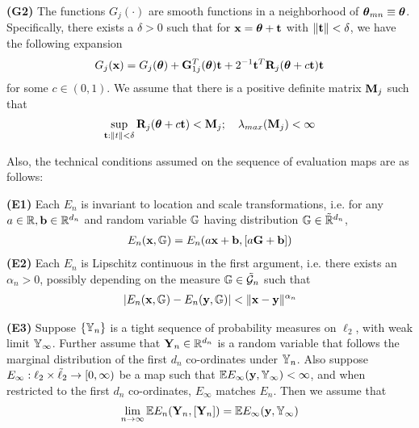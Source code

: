 \noindent\textbf{(G2)} 
The functions $G_{j} (\cdot)$ are smooth functions in a neighborhood of ${\boldsymbol{\theta}}_{ m n} \equiv {\boldsymbol{\theta}}$. 
Specifically, there exists a $\delta > 0$ such that for 
$ {\bf{x}} = {\boldsymbol{\theta}} + {\bf{t}}$ with $\| {\bf{t}} \| < \delta$, we have the following expansion
%
\begin{align}
G_{j} ({\bf{x}}) = G_{j} ({\boldsymbol{\theta}}) + {\mathbf{G}}_{1 j}^{T} ({\boldsymbol{\theta}}) {\bf{t}} 
+ 2^{-1} {\bf{t}}^{T} {\mathbf{R}}_{j} ({\boldsymbol{\theta}} + c {\bf{t}}) {\bf{t}}
\end{align}
%
for some $c \in (0, 1)$. We assume that there is a positive definite matrix ${\mathbf{M}}_{j}$ such that 
\begin{align}
\sup_{{\bf{t}}: \| t \| < \delta} {\mathbf{R}}_{j} ({\boldsymbol{\theta}} + c {\bf{t}}) < {\mathbf{M}}_{j}; \quad \lambda_{max} ({\mathbf{M}}_{j}) < \infty
\end{align}
\vspace{1em}

Also, the technical conditions assumed on the sequence of evaluation maps are as follows: 

\vspace{1em}
\noindent\textbf{(E1)}
Each $E_n$ is invariant to location and scale transformations, i.e. for any $a \in {\mathbb{R}}, {\bf{b}} \in {\mathbb{R}}^{d_n}$ and random variable ${\mathbb{G}}$ having distribution ${\mathbb{G}} \in \tilde {{\mathbb{R}}}^{d_n}$,
%
\begin{align}
E_n ({\bf{x}}, {\mathbb{G}}) = E_n ( a{\bf{x}} + {\bf{b}}, [ a {\mathbf{G}} + {\bf{b}} ])
\end{align}
%
\noindent\textbf{(E2)}
Each $E_n$ is Lipschitz continuous in the first argument, i.e. there exists an $\alpha_n > 0$, possibly depending on the measure ${\mathbb{G}} \in \tilde {{\cal{G}}}_n$ such that
%
\begin{align}
| E_n ({\bf{x}}, {\mathbb{G}}) - E_n ( {\bf{y}}, {\mathbb{G}} ) | < \| {\bf{x}} - {\bf{y}} \|^{ \alpha_n }
\end{align}


\noindent\textbf{(E3)}
Suppose $\{ {\mathbb{Y}}_{n} \}$ is a tight sequence of probability measures on $\ell_{2}$, with weak limit ${\mathbb{Y}}_{\infty}$. Further assume that ${\mathbf{Y}}_{n} \in {\mathbb{R}}^{d_{n}}$ is a random variable that follows the marginal distribution of the first $d_{n}$ co-ordinates under ${\mathbb{Y}}_{n}$. Also suppose $E_{\infty} : \ell_{2} \times \tilde{\ell}_{2} \rightarrow [0, \infty)$ be a map such that ${\mathbb{E}} E_\infty ({\bf{y}}, {\mathbb{Y}}_\infty ) < \infty$, and when restricted to the first $d_{n}$ co-ordinates, $E_{\infty}$ matches 
$E_{n}$. Then we assume that
%
\begin{align}
\lim_{n \rightarrow \infty} {\mathbb{E}} E_n ({\mathbf{Y}}_n, [{\mathbf{Y}}_n]) = {\mathbb{E}} E_\infty ({\bf{y}}, {\mathbb{Y}}_\infty )
\end{align}

